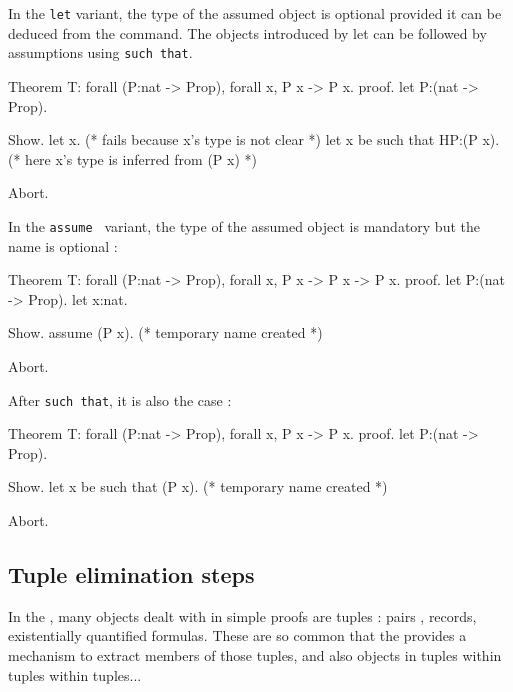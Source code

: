 In the {\tt let} variant, the type of the assumed object is optional
provided it can be deduced from the command. The objects introduced by
let can be followed by assumptions using {\tt such that}.

\begin{coq_eval}
Theorem T: forall (P:nat -> Prop), forall x, P x -> P x.
proof.
let P:(nat -> Prop).
\end{coq_eval} 
\begin{coq_example}
Show.
let x. (* fails because x's type is not clear *) 
let x be such that HP:(P x). (* here x's type is inferred from (P x) *)
\end{coq_example}
\begin{coq_eval}
Abort.
\end{coq_eval}

In the {\tt assume } variant, the type of the assumed object is mandatory but the name is optional :

\begin{coq_eval}
Theorem T: forall (P:nat -> Prop), forall x, P x -> P x -> P x.
proof.
let P:(nat -> Prop).
let x:nat.
\end{coq_eval} 
\begin{coq_example}
Show.
assume (P x). (* temporary name created *)
\end{coq_example}
\begin{coq_eval}
Abort.
\end{coq_eval}

After {\tt such that}, it is also the case :

\begin{coq_eval}
Theorem T: forall (P:nat -> Prop), forall x, P x -> P x.
proof.
let P:(nat -> Prop).
\end{coq_eval} 
\begin{coq_example}
Show.
let x be such that (P x). (* temporary name created *)
\end{coq_example}
\begin{coq_eval}
Abort.
\end{coq_eval}

\subsection{Tuple elimination steps}

In the \CIC, many objects dealt with in simple proofs are tuples :
pairs , records, existentially quantified formulas. These are so
common that the \DPL{} provides a mechanism to extract members of
those tuples, and also objects in tuples within tuples within
tuples...

